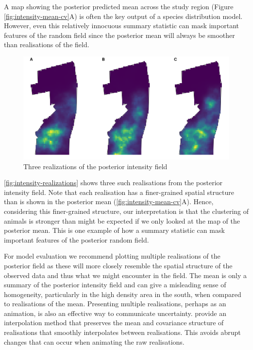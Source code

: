 \documentclass{stylefile16/statsoc}
\begin{document}
A map showing the posterior predicted mean across the study region (Figure \ref{fig:intensity-mean-cv}A) is often the key output of a species distribution model.  However, even this relatively innocuous summary statistic can mask important features of the random field since the posterior mean will always be smoother than realisations of the field.
\begin{figure}[!htb]
	\includegraphics[scale=0.525]{figures/intensity_realized.png}
	\caption{Three realizations of the posterior intensity field}
	\label{fig:intensity-realizations}
\end{figure}
\autoref{fig:intensity-realizations} shows three such realisations from the posterior intensity field.  Note that each realisation has a finer-grained spatial structure than is shown in the posterior mean (\autoref{fig:intensity-mean-cv}A).  Hence, considering this finer-grained structure, our interpretation is that the clustering of animals is stronger than might be expected if we only looked at the map of the posterior mean.  This is one example of how a summary statistic can mask important features of the posterior random field.

For model evaluation we recommend plotting multiple realisations of the posterior field as these will more closely resemble the spatial structure of the observed data and thus what we might encounter in the field.  The mean is only a summary of the posterior intensity field and can give a misleading sense of homogeneity, particularly in the high density area in the south, when compared to realisations of the mean.  Presenting multiple realisations, perhaps as an animation, is also an effective way to communicate uncertainty. \cite{bowman_GraphicsUncertainty_2019a} provide an interpolation method that preserves the mean and covariance structure of realisations that smoothly interpolates between realisations.  This avoids abrupt changes that can occur when animating the raw realisations.  
\end{document}

